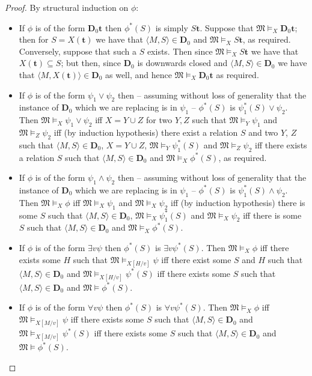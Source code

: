\documentclass{article}
\theoremstyle{definition}
\newcommand{\tuple}{\mathbf}
\newcommand{\M}{\mathfrak M}
\newcommand{\D}{\mathbf D}
\begin{document}
\begin{proof}
	By structural induction on $\phi$: 
	\begin{itemize}
		\item If $\phi$ is of the form $\D_0 \tuple t$ then $\phi^*(S)$ is simply $S \tuple t$. Suppose that $\M \models_X \D_0 \tuple t$; then for $S = X(\tuple t)$ we have that $\langle M, S\rangle \in \D_0$ and $\M \models_X S \tuple t$, as required. Conversely, suppose that such a $S$ exists. Then since $\M \models_X S \tuple t$ we have that $X(\tuple t) \subseteq S$; but then, since $\D_0$ is downwards closed and $\langle M, S\rangle \in \D_0$ we have that $\langle M, X(\tuple t)\rangle \in \D_0$ as well, and hence $\M \models_X \D_0 \tuple t$ as required. 

		\item If $\phi$ is of the form $\psi_1 \vee \psi_2$ then -- assuming without loss of generality that the instance of $\D_0$ which we are replacing is in $\psi_1$ -- $\phi^*(S)$ is $\psi_1^*(S) \vee \psi_2$. Then $\M \models_X \psi_1 \vee \psi_2$ iff $X = Y \cup Z$ for two $Y, Z$ such that $\M \models_Y \psi_1$ and $\M \models_Z \psi_2$ iff (by induction hypothesis) there  exist a relation $S$  and two $Y$, $Z$ such that $\langle M, S\rangle \in \D_0$, $X = Y \cup Z$, $\M \models_Y \psi_1^*(S)$ and $\M \models_Z \psi_2$ iff there exists a relation $S$ such that $\langle M, S\rangle \in \D_0$ and $\M \models_X \phi^*(S)$, as required. 
		\item If $\phi$ is of the form $\psi_1 \wedge \psi_2$ then -- assuming without loss of generality that the instance of $\D_0$ which we are replacing is in $\psi_1$ -- $\phi^*(S)$ is $\psi_1^*(S) \wedge \psi_2$. Then $\M \models_X \phi$ iff $\M \models_X \psi_1$ and $\M \models_X \psi_2$ iff (by induction hypothesis) there is some $S$ such that $\langle M,S\rangle \in \D_0$, $\M \models_X \psi_1^*(S)$ and $\M \models_X \psi_2$ iff there is some $S$ such that $\langle M, S \rangle \in \D_0$ and $\M \models_X \phi^*(S)$. 
		\item If $\phi$ is of the form $\exists v \psi$ then $\phi^*(S)$ is $\exists v \psi^*(S)$. Then $\M \models_X \phi$ iff there exists some $H$ such that $\M \models_{X[H/v]} \psi$ iff there exist some $S$ and $H$ such that $\langle M,  S\rangle \in \D_0$ and $\M \models_{X[H/v]} \psi^*(S)$ iff there exists some $S$ such that $\langle M, S\rangle \in \D_0$ and $\M \models \phi^*(S)$. 
		\item If $\phi$ is of the form $\forall v \psi$ then $\phi^*(S)$ is $\forall v \psi^*(S)$. Then $\M \models_X \phi$ iff $\M \models_{X[M/v]} \psi$ iff there exists some $S$ such that $\langle M, S\rangle \in \D_0$ and $\M \models_{X[M/v]} \psi^*(S)$ iff there exists some $S$ such that $\langle M,S\rangle \in \D_0$ and $\M \models \phi^*(S)$. 
	\end{itemize}
\end{proof}
\end{document}
